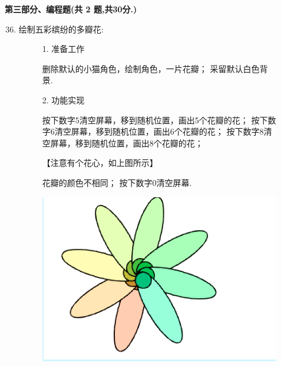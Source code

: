 \documentclass[10pt, a4paper]{article}
\begin{document}
    \newpage
    {\noindent \textbf{第三部分、编程题(共 2 题,共30分.)}}
    \begin{enumerate}
        \setcounter{enumi}{35}
        
        \item 绘制五彩缤纷的多瓣花:
        \begin{figure}[htbp]
            \begin{minipage}{.6\textwidth}
                1. 准备工作
                \begin{tasks}[label = (\arabic*)]
                    \task 删除默认的小猫角色，绘制角色，一片花瓣；
                    \task 采留默认白色背景.
                \end{tasks}
                2. 功能实现
                \begin{tasks}[label = (\arabic*)]
                    \task 按下数字5清空屏幕，移到随机位置，画出5个花瓣的花；
                    \task 按下数字6清空屏幕，移到随机位置，画出6个花瓣的花；
                    \task 按下数字8清空屏幕，移到随机位置，画出8个花瓣的花；

                    【注意有个花心，如上图所示】

                    \task 花瓣的颜色不相同；
                    \task 按下数字0清空屏幕.
                \end{tasks}
            \end{minipage}
            \begin{minipage}{.37\textwidth}
                \centering
                \includegraphics[width=\textwidth]{36.png}
            \end{minipage}
        \end{figure}


\end{enumerate}
\end{document}
